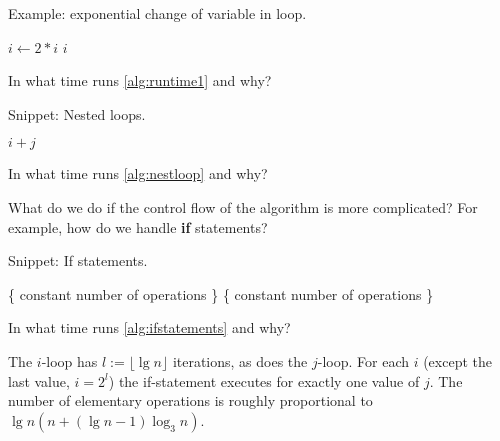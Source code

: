 \begin{algorithm}[H]
  \caption{Example: exponential change of variable in loop.
    \label{alg:runtime1}}
\begin{algorithmic}[0]
\State {}
	\State $i \gets 2*i$
	\State {} $i$
\EndWhile
\end{algorithmic}
\end{algorithm}

\begin{Boxample}[4]
In what time runs \cref{alg:runtime1} and why?
\end{Boxample}

\begin{algorithm}[H]
  \caption{Snippet: Nested loops.}
    \label{alg:nestloop}
\begin{algorithmic}[0]
		\State {} $i+j$
	\EndFor
\EndFor
\end{algorithmic}
\end{algorithm}
\begin{Boxample}[4]
In what time runs \cref{alg:nestloop} and why?
\end{Boxample}

What do we do if the control flow of the algorithm is more complicated? For example, how do we handle \textbf{if} statements?

\begin{algorithm}[H]
  \caption{Snippet: If statements.}
  \label{alg:ifstatements}
\begin{algorithmic}[0]
				\State \{ constant number of operations \} 
			\EndFor
		\Else
				\State \{ constant number of operations \}
			\EndFor
		\EndIf
	\EndFor
\EndFor
\end{algorithmic}
\end{algorithm}
\begin{Boxample}[6]
In what time runs \cref{alg:ifstatements} and why? 
\end{Boxample}

The $i$-loop has $l:=\lfloor \lg n \rfloor$ iterations, as does the $j$-loop. 
For each $i$ (except the last value, $i = 2^l$) the if-statement executes for 
exactly one value of $j$. The number of elementary operations is roughly 
proportional to $\lg n (n + (\lg n - 1)\log_3 n)$. 
\fi




